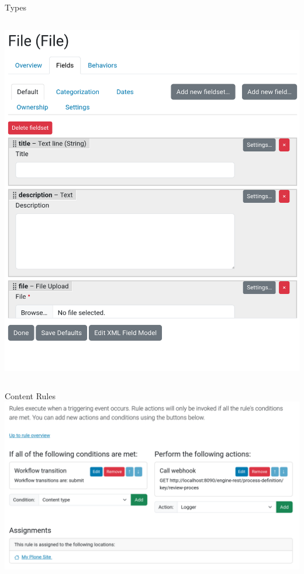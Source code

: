 \documentclass[12pt,aspectratio=169]{beamer}
\begin{document}
\begin{frame}{Types}
\begin{columns}
\begin{column}{0.35\textwidth}
      \includegraphics[width=0.95\columnwidth]{images/dexterity-02.png}
    \end{column}
  \end{columns}
\end{frame}


\begin{frame}{Content Rules}
  \includegraphics[width=0.95\columnwidth]{images/content-rules.png}
\end{frame}
\end{document}
